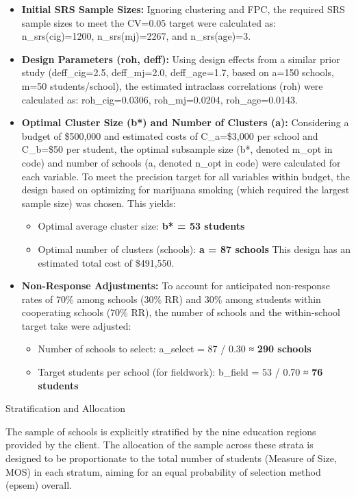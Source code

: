 \documentclass[
  12pt]{article}
\begin{document}
\begin{itemize}
\item
  \textbf{Initial SRS Sample Sizes:} Ignoring clustering and FPC, the
  required SRS sample sizes to meet the CV=0.05 target were calculated
  as: n\_srs(cig)=1200, n\_srs(mj)=2267, and n\_srs(age)=3.
\item
  \textbf{Design Parameters (roh, deff):} Using design effects from a
  similar prior study (deff\_cig=2.5, deff\_mj=2.0, deff\_age=1.7, based
  on a=150 schools, m=50 students/school), the estimated intraclass
  correlations (roh) were calculated as: roh\_cig=0.0306,
  roh\_mj=0.0204, roh\_age=0.0143.
\item
  \textbf{Optimal Cluster Size (b*) and Number of Clusters (a):}
  Considering a budget of \$500,000 and estimated costs of C\_a=\$3,000
  per school and C\_b=\$50 per student, the optimal subsample size (b*,
  denoted m\_opt in code) and number of schools (a, denoted n\_opt in
  code) were calculated for each variable. To meet the precision target
  for all variables within budget, the design based on optimizing for
  marijuana smoking (which required the largest sample size) was chosen.
  This yields:

  \begin{itemize}
  \item
    Optimal average cluster size: \textbf{b* = 53 students}
  \item
    Optimal number of clusters (schools): \textbf{a = 87 schools} This
    design has an estimated total cost of \$491,550.
  \end{itemize}
\item
  \textbf{Non-Response Adjustments:} To account for anticipated
  non-response rates of 70\% among schools (30\% RR) and 30\% among
  students within cooperating schools (70\% RR), the number of schools
  and the within-school target take were adjusted:

  \begin{itemize}
  \item
    Number of schools to select: a\_select = 87 / 0.30 ≈ \textbf{290
    schools}
  \item
    Target students per school (for fieldwork): b\_field = 53 / 0.70 ≈
    \textbf{76 students}
  \end{itemize}
\end{itemize}

Stratification and Allocation

The sample of schools is explicitly stratified by the nine education
regions provided by the client. The allocation of the sample across
these strata is designed to be proportionate to the total number of
students (Measure of Size, MOS) in each stratum, aiming for an equal
probability of selection method (epsem) overall.
\end{document}

